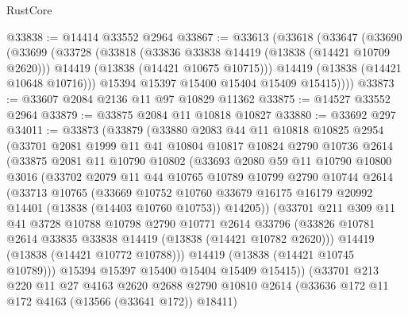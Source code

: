 \begin{lexlean}{RustCore}
\begin{coremodule}
@33838 := @14414 @33552 @2964
@33867 := @33613
    (@33618
      (@33647
        (@33690
          (@33699
            (@33728
              (@33818
                (@33836 @33838 @14419 (@13838 (@14421 @10709 @2620)))
                @14419
                (@13838 (@14421 @10675 @10715)))
              @14419
              (@13838 (@14421 @10648 @10716)))
            @15394
            @15397
            @15400
            @15404
            @15409
            @15415))))
@33873 := @33607 @2084 @2136 @11 @97 @10829 @11362
@33875 := @14527 @33552 @2964
@33879 := @33875 @2084 @11 @10818 @10827
@33880 := @33692 @297
@34011 := @33873
    (@33879
      (@33880
        @2083
        @44
        @11
        @10818
        @10825
        @2954
        (@33701
          @2081
          @1999
          @11
          @41
          @10804
          @10817
          @10824
          @2790
          @10736
          @2614
          (@33875
            @2081
            @11
            @10790
            @10802
            (@33693
              @2080
              @59
              @11
              @10790
              @10800
              @3016
              (@33702
                @2079
                @11
                @44
                @10765
                @10789
                @10799
                @2790
                @10744
                @2614
                (@33713
                  @10765
                  (@33669
                    @10752
                    @10760
                    @33679
                    @16175
                    @16179
                    @20992
                    @14401
                    (@13838 (@14403 @10760 @10753))
                    @14205))
                (@33701
                  @211
                  @309
                  @11
                  @41
                  @3728
                  @10788
                  @10798
                  @2790
                  @10771
                  @2614
                  @33796
                  (@33826 @10781 @2614 @33835 @33838 @14419 (@13838 (@14421 @10782 @2620)))
                  @14419
                  (@13838 (@14421 @10772 @10788)))
                @14419
                (@13838 (@14421 @10745 @10789)))
              @15394
              @15397
              @15400
              @15404
              @15409
              @15415))
          (@33701
            @213
            @220
            @11
            @27
            @4163
            @2620
            @2688
            @2790
            @10810
            @2614
            (@33636 @172 @11 @172 @4163 (@13566 (@33641 @172)) @18411)

\end{coremodule}
\end{lexlean}
